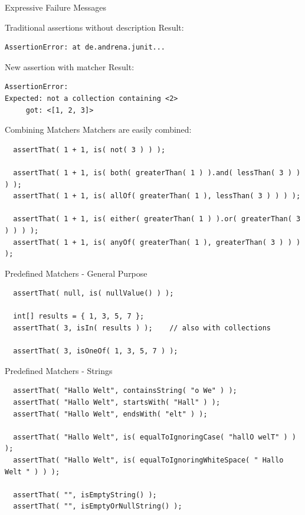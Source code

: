 \begin{frame}[fragile]{Expressive Failure Messages}
    \begin{block}{Traditional assertions without description}
Result:
\begin{lstlisting}
AssertionError: at de.andrena.junit...
\end{lstlisting}
    \end{block}	
\pause
    \begin{block}{New assertion with matcher}
Result:
\begin{lstlisting}
AssertionError:
Expected: not a collection containing <2>
     got: <[1, 2, 3]>
\end{lstlisting}
    \end{block}
\end{frame}


\begin{frame}[fragile]{Combining Matchers}
	Matchers are easily combined:

\begin{lstlisting}
  assertThat( 1 + 1, is( not( 3 ) ) );

  assertThat( 1 + 1, is( both( greaterThan( 1 ) ).and( lessThan( 3 ) ) ) );
  assertThat( 1 + 1, is( allOf( greaterThan( 1 ), lessThan( 3 ) ) ) );

  assertThat( 1 + 1, is( either( greaterThan( 1 ) ).or( greaterThan( 3 ) ) ) );
  assertThat( 1 + 1, is( anyOf( greaterThan( 1 ), greaterThan( 3 ) ) ) );
\end{lstlisting}

\end{frame}

\begin{frame}[fragile]{Predefined Matchers - General Purpose}
\begin{lstlisting}
  assertThat( null, is( nullValue() ) );

  int[] results = { 1, 3, 5, 7 };
  assertThat( 3, isIn( results ) );    // also with collections

  assertThat( 3, isOneOf( 1, 3, 5, 7 ) );
\end{lstlisting}
\end{frame}


\begin{frame}[fragile]{Predefined Matchers - Strings}
\begin{lstlisting}
  assertThat( "Hallo Welt", containsString( "o We" ) );
  assertThat( "Hallo Welt", startsWith( "Hall" ) );
  assertThat( "Hallo Welt", endsWith( "elt" ) );
        
  assertThat( "Hallo Welt", is( equalToIgnoringCase( "hallO welT" ) ) );
  assertThat( "Hallo Welt", is( equalToIgnoringWhiteSpace( " Hallo    Welt " ) ) );

  assertThat( "", isEmptyString() );
  assertThat( "", isEmptyOrNullString() );
\end{lstlisting}
\end{frame}


